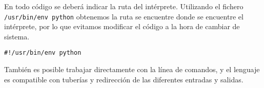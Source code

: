 \documentclass[12pt]{article} %
\begin{document}
En todo código se deberá indicar la ruta del intérprete. Utilizando el fichero \verb+/usr/bin/env python+ obtenemos la ruta se encuentre donde se encuentre el intérprete, por lo que evitamos modificar el código a la hora de cambiar de sistema.
	\lstset{language=python, showspaces=false}
	\begin{lstlisting}[frame=single, showspaces=false]
	#!/usr/bin/env python
	\end{lstlisting}

También es posible trabajar directamente con la línea de comandos, y el lenguaje es compatible con tuberías y redirección de las diferentes entradas y salidas.

%
%
%
%
%
%
%
%
%
%
%
%
%
\end{document}
